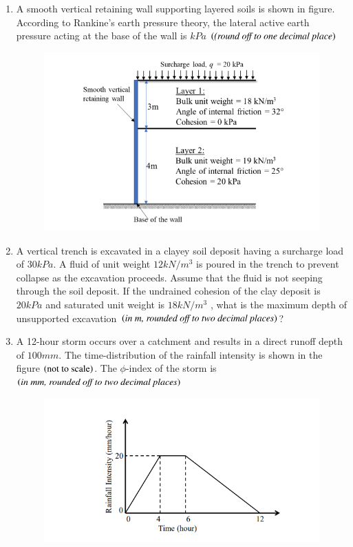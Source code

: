 \documentclass[journal,12pt,onecolumn]{IEEEtran}
\theoremstyle{remark}
\begin{document}
\begin{enumerate}
\item A smooth vertical retaining wall supporting layered soils is shown in figure. According to Rankine’s earth pressure theory, the lateral active earth pressure acting at the base of the wall is \underline{\hspace{2cm}}$kPa$ $\left(\textit{(round
off to one decimal place}\right)$

\hfill{}
\begin{figure}[H]
    \centering
    \includegraphics[width=0.5\linewidth]{figs/q57.png}
    \caption*{}
    \label{fig:Q.57}
\end{figure}

\item A vertical trench is excavated in a clayey soil deposit having a surcharge load of $30 kPa$. A fluid of unit weight $12 kN/m^3$
is poured in the trench to prevent collapse as the excavation proceeds. Assume that the fluid is not seeping through the soil
deposit. If the undrained cohesion of the clay deposit is $20 kPa$ and saturated unit weight is $18 kN/m^3$ , what is the maximum depth of unsupported excavation $\left(\textit{in m,
rounded off to two decimal places}\right)$? \underline{\hspace{3cm}}

\hfill{}

\item A 12-hour storm occurs over a catchment and results in a direct runoff depth of $100 mm$. The time-distribution of the rainfall intensity is shown in the figure $\left(\text{not to scale}\right)$. The $\phi$-index of the storm is $\left(\textit{in mm, rounded off to two decimal places}\right)$ \underline{\hspace{3cm}}

\hfill{}
\begin{figure}[H]
    \centering
    \includegraphics[width=0.5\linewidth]{figs/q59.png}
    \caption*{}
    \label{fig:Q.59}
\end{figure}


\end{enumerate}
\end{document}
